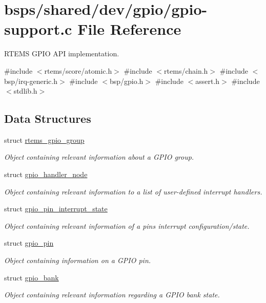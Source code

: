 \hypertarget{gpio-support_8c}{}\section{bsps/shared/dev/gpio/gpio-\/support.c File Reference}
\label{gpio-support_8c}


R\+T\+E\+MS G\+P\+IO A\+PI implementation.  


{\ttfamily \#include $<$rtems/score/atomic.\+h$>$}\newline
{\ttfamily \#include $<$rtems/chain.\+h$>$}\newline
{\ttfamily \#include $<$bsp/irq-\/generic.\+h$>$}\newline
{\ttfamily \#include $<$bsp/gpio.\+h$>$}\newline
{\ttfamily \#include $<$assert.\+h$>$}\newline
{\ttfamily \#include $<$stdlib.\+h$>$}\newline
\subsection*{Data Structures}
\begin{DoxyCompactItemize}
\item 
struct \mbox{\hyperlink{structrtems__gpio__group}{rtems\+\_\+gpio\+\_\+group}}
\begin{DoxyCompactList}\small\item\em Object containing relevant information about a G\+P\+IO group. \end{DoxyCompactList}\item 
struct \mbox{\hyperlink{structgpio__handler__node}{gpio\+\_\+handler\+\_\+node}}
\begin{DoxyCompactList}\small\item\em Object containing relevant information to a list of user-\/defined interrupt handlers. \end{DoxyCompactList}\item 
struct \mbox{\hyperlink{structgpio__pin__interrupt__state}{gpio\+\_\+pin\+\_\+interrupt\+\_\+state}}
\begin{DoxyCompactList}\small\item\em Object containing relevant information of a pin\textquotesingle{}s interrupt configuration/state. \end{DoxyCompactList}\item 
struct \mbox{\hyperlink{structgpio__pin}{gpio\+\_\+pin}}
\begin{DoxyCompactList}\small\item\em Object containing information on a G\+P\+IO pin. \end{DoxyCompactList}\item 
struct \mbox{\hyperlink{structgpio__bank}{gpio\+\_\+bank}}
\begin{DoxyCompactList}\small\item\em Object containing relevant information regarding a G\+P\+IO bank state. \end{DoxyCompactList}\end{DoxyCompactItemize}
